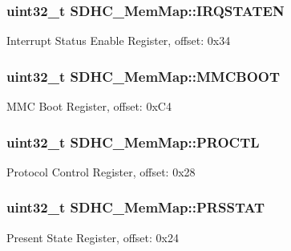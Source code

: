 \subsubsection[{I\+R\+Q\+S\+T\+A\+T\+E\+N}]{\setlength{\rightskip}{0pt plus 5cm}uint32\+\_\+t S\+D\+H\+C\+\_\+\+Mem\+Map\+::\+I\+R\+Q\+S\+T\+A\+T\+E\+N}\label{struct_s_d_h_c___mem_map_a6bc70391d95768a1b757bf17731f5f97}
Interrupt Status Enable Register, offset\+: 0x34 \hypertarget{struct_s_d_h_c___mem_map_a624306ff04a5ff80059afce5d4e8cf3e}{}
\subsubsection[{M\+M\+C\+B\+O\+O\+T}]{\setlength{\rightskip}{0pt plus 5cm}uint32\+\_\+t S\+D\+H\+C\+\_\+\+Mem\+Map\+::\+M\+M\+C\+B\+O\+O\+T}\label{struct_s_d_h_c___mem_map_a624306ff04a5ff80059afce5d4e8cf3e}
M\+M\+C Boot Register, offset\+: 0x\+C4 \hypertarget{struct_s_d_h_c___mem_map_a432bb135855124848d9d885a4f31d88f}{}
\subsubsection[{P\+R\+O\+C\+T\+L}]{\setlength{\rightskip}{0pt plus 5cm}uint32\+\_\+t S\+D\+H\+C\+\_\+\+Mem\+Map\+::\+P\+R\+O\+C\+T\+L}\label{struct_s_d_h_c___mem_map_a432bb135855124848d9d885a4f31d88f}
Protocol Control Register, offset\+: 0x28 \hypertarget{struct_s_d_h_c___mem_map_ad0cb5c4547908b9fc980737545a49824}{}
\subsubsection[{P\+R\+S\+S\+T\+A\+T}]{\setlength{\rightskip}{0pt plus 5cm}uint32\+\_\+t S\+D\+H\+C\+\_\+\+Mem\+Map\+::\+P\+R\+S\+S\+T\+A\+T}\label{struct_s_d_h_c___mem_map_ad0cb5c4547908b9fc980737545a49824}
Present State Register, offset\+: 0x24 \hypertarget{struct_s_d_h_c___mem_map_ae3204e728de4488f0b3569d1ebac78ae}{}
